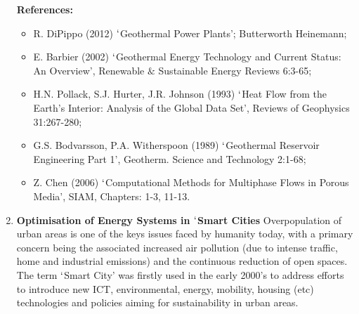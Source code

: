 \documentclass[12pts,a4paper,amsmath,amssymb,floatfix]{article}%
\begin{document}
\begin{enumerate}[label=\bfseries Project: \arabic*:]
\noindent
{\bf References:}
\begin{itemize}
\item R. DiPippo (2012) $\lq$Geothermal Power Plants'; Butterworth Heinemann;
\item E. Barbier (2002) $\lq$Geothermal Energy Technology and Current Status: An Overview', Renewable $\&$ Sustainable Energy Reviews 6:3-65;
\item H.N. Pollack, S.J. Hurter, J.R. Johnson (1993) $\lq$Heat Flow from the Earth's Interior: Analysis of the Global Data Set', Reviews of Geophysics 31:267-280;
\item G.S. Bodvarsson, P.A. Witherspoon (1989) $\lq$Geothermal Reservoir Engineering Part 1', Geotherm. Science and Technology 2:1-68;
\item Z. Chen (2006) $\lq$Computational Methods for Multiphase Flows in Porous Media', SIAM, Chapters: 1-3, 11-13.
\end{itemize}

\clearpage


\item {\bf Optimisation of Energy Systems in $\lq$Smart Cities}
Overpopulation of urban areas is one of the keys issues faced by humanity today, with a primary concern being the associated increased air pollution (due to intense traffic, home and industrial emissions) and the continuous reduction of open spaces. The term $\lq$Smart City’ was firstly used  in the early 2000’s to address efforts to introduce new ICT, environmental, energy, mobility, housing (etc) technologies and policies aiming for sustainability in urban areas.


\end{enumerate}
\end{document}
